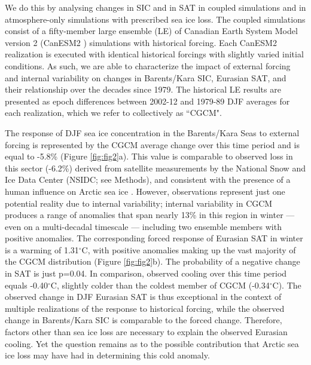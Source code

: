 \documentclass{nature}
\begin{document}
We do this by analysing changes in SIC and in SAT in coupled simulations and in atmosphere-only simulations with prescribed sea ice loss. The coupled simulations consist of a fifty-member large ensemble (LE) of Canadian Earth System Model version 2 (CanESM2 \cite{arora11}) simulations with historical forcing. Each CanESM2 realization is executed with identical historical forcings with slightly varied initial conditions. As such, we are able to characterize the impact of external forcing and internal variability on changes in Barents/Kara SIC, Eurasian SAT, and their relationship over the decades since 1979. The historical LE results are presented as epoch differences between 2002-12 and 1979-89 DJF averages for each realization, which we refer to collectively as ``CGCM". 

The response of DJF sea ice concentration in the Barents/Kara Seas to external forcing is represented by the CGCM average change over this time period and is equal to -5.8\% (Figure \ref{fig:fig2}a). This value is comparable to observed loss in this sector (-6.2\%) derived from satellite measurements by the National Snow and Ice Data Center (NSIDC; see Methods), and consistent with the presence of a human influence on Arctic sea ice \cite{min08}. However, observations represent just one potential reality due to internal variability; internal variability in CGCM produces a range of anomalies that span nearly 13\% in this region in winter --- even on a multi-decadal timescale --- including two ensemble members with positive anomalies. The corresponding forced response of Eurasian SAT in winter is a warming of 1.31$^\circ$C, with positive anomalies making up the vast majority of the CGCM distribution  (Figure \ref{fig:fig2}b). The probability of a negative change in SAT is just p=0.04. In comparison, observed cooling over this time period equals -0.40$^\circ$C, slightly colder than the coldest member of CGCM (-0.34$^\circ$C). The observed change in DJF Eurasian SAT is thus exceptional in the context of multiple realizations of the response to historical forcing, while the observed change in Barents/Kara SIC is comparable to the forced change. Therefore, factors other than sea ice loss are necessary to explain the observed Eurasian cooling. Yet the question remains as to the possible contribution that Arctic sea ice loss may have had in determining this cold anomaly. %
\end{document}

